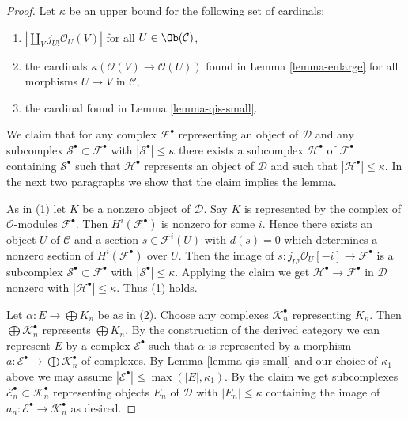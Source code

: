 \begin{proof}
Let $\kappa$ be an upper bound for the following set of cardinals:
\begin{enumerate}
\item $|\coprod_V j_{U!}\mathcal{O}_U(V)|$ for all $U \in \Ob(\mathcal{C})$,
\item the cardinals $\kappa(\mathcal{O}(V) \to \mathcal{O}(U))$
found in Lemma \ref{lemma-enlarge} for all morphisms $U \to V$ in
$\mathcal{C}$,
\item the cardinal found in Lemma \ref{lemma-qis-small}.
\end{enumerate}
We claim that for any complex $\mathcal{F}^\bullet$ representing an object of
$\mathcal{D}$ and any subcomplex
$\mathcal{S}^\bullet \subset \mathcal{F}^\bullet$
with $|\mathcal{S}^\bullet| \leq \kappa$ there exists a subcomplex
$\mathcal{H}^\bullet$ of $\mathcal{F}^\bullet$ containing $\mathcal{S}^\bullet$
such that $\mathcal{H}^\bullet$ represents an object of $\mathcal{D}$
and such that $|\mathcal{H}^\bullet| \leq \kappa$.
In the next two paragraphs we show that the claim implies the lemma.

\medskip\noindent
As in (1) let $K$ be a nonzero object of $\mathcal{D}$. Say $K$ is
represented by the complex
of $\mathcal{O}$-modules $\mathcal{F}^\bullet$. Then $H^i(\mathcal{F}^\bullet)$
is nonzero for some $i$. Hence there exists an object $U$ of $\mathcal{C}$
and a section $s \in \mathcal{F}^i(U)$ with $d(s) = 0$ which determines a
nonzero section of $H^i(\mathcal{F}^\bullet)$ over $U$. Then the image
of $s : j_{U!}\mathcal{O}_U[-i] \to \mathcal{F}^\bullet$ is a subcomplex
$\mathcal{S}^\bullet \subset \mathcal{F}^\bullet$ with
$|\mathcal{S}^\bullet| \leq \kappa$. Applying the claim we get
$\mathcal{H}^\bullet \to \mathcal{F}^\bullet$ in $\mathcal{D}$ nonzero
with $|\mathcal{H}^\bullet| \leq \kappa$. Thus (1) holds.

\medskip\noindent
Let $\alpha : E \to \bigoplus K_n$ be as in (2).
Choose any complexes $\mathcal{K}_n^\bullet$ representing $K_n$.
Then $\bigoplus \mathcal{K}_n^\bullet$ represents $\bigoplus K_n$.
By the construction of the derived category we can represent
$E$ by a complex $\mathcal{E}^\bullet$ such that $\alpha$
is represented by a morphism
$a : \mathcal{E}^\bullet \to \bigoplus \mathcal{K}_n^\bullet$
of complexes. By Lemma \ref{lemma-qis-small} and our choice of
$\kappa_1$ above we may assume
$|\mathcal{E}^\bullet| \leq \max(|E|, \kappa_1)$. By the claim
we get subcomplexes $\mathcal{E}_n^\bullet \subset \mathcal{K}_n^\bullet$
representing objects $E_n$ of $\mathcal{D}$ with $|E_n| \leq \kappa$
containing the image of $a_n : \mathcal{E}^\bullet \to \mathcal{K}_n^\bullet$
as desired.


\end{proof}
